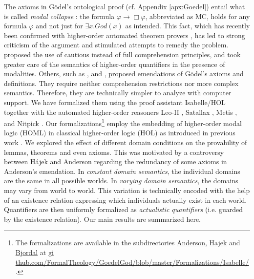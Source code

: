 \documentclass{birkjour}
\theoremstyle{definition}
\theoremstyle{remark}
\numberwithin{equation}{section}
\begin{document}
\noindent The axioms in G\"odel's ontological proof
\citep{GoedelNotes,ScottNotes} (cf. Appendix \ref{apx:Goedel}) entail
what is called \emph{modal collapse}
\citep{Sobel1987,SobelBook2004}: the formula $\varphi \rightarrow \Box
\varphi$, abbreviated as MC, holds for any formula $\varphi$ and not
just for $\exists x. \mathit{God}(x)$ as intended. This fact, which
has recently been confirmed with higher-order automated theorem
provers \citep{C40,J30}, has led to strong criticism of the argument
and stimulated attempts to remedy the problem.
\citet{Hajek_Magari_and_others_1996,Hajek_der_Mathematiker_2001}
proposed the use of cautious instead of full comprehension principles,
and \citet{fitting02:_types_tableaus_god} took
greater care of the semantics of higher-order quantifiers
in the presence of modalities. Others, such as
\citet{anderson90:_some_emend_of_goedel_ontol_proof}, \citet{Hajek2002}
and \citet{bjordal99}, proposed emendations of G\"odel's
axioms and definitions. They require neither comprehension
restrictions nor more complex semantics. Therefore, they are
technically simpler to analyze with computer support. We have
formalized them using the proof assistant Isabelle/HOL \citep{Isabelle}
together with the automated higher-order reasoners Leo-II \citep{C26},
Satallax \citep{brown2012satallax}, Metis 
\citep{Hurd03first-orderproof}, and Nitpick \citep{Nitpick}.   Our
formalizations\footnote{The   formalizations are available in the
subdirectories \url{Anderson}, \url{Hajek} and \url{Bjordal} at \url{gi
thub.com/FormalTheology/GoedelGod/blob/master/Formalizations/Isabelle/
}.} employ the embedding of higher-order modal logic (HOML) in
classical higher-order logic (HOL) as introduced in previous work
\citep{C40,J30,J23}. We explored the effect of different domain
conditions on the provability of lemmas, theorems and even axioms.
This was motivated by a controversy between Hájek and Anderson
regarding the redundancy of some axioms in Anderson's emendation. In
\emph{constant domain semantics}, the individual domains are the same
in all possible worlds. In \emph{varying domain semantics}, the
domains may vary from world to world. This variation is technically
encoded with the help of an existence relation expressing which
individuals actually exist in each world. Quantifiers are then
uniformly formalized as \emph{actualistic quantifiers} (i.e. guarded by
the existence relation). Our main results are summarized here.

\end{document}
